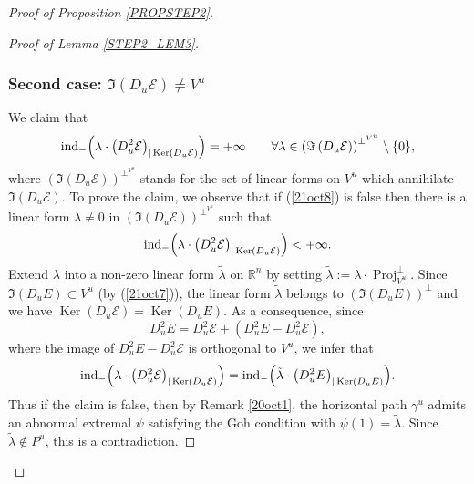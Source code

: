 \documentclass[JEP,XML,SOM,Unicode,NoFloatCountersInSection,published]{cedram}
\DeclareMathOperator{\Ker}{Ker}
\DeclareMathOperator{\Proj}{Proj}
\newcommand\R{\mathbb R}
\theoremstyle{definition}
\begin{document}
\begin{proof}[Proof of Proposition \ref{PROPSTEP2}]
\begin{proof}[Proof of Lemma \ref{STEP2_LEM3}]
\subsubsection*{Second case: $ \Im (D_{u} \mathcal{E})\neq V^{u}$}
We claim that
\begin{equation}\label{21oct8}
\mathrm{ind}_- \Bigl(\lambda \cdot \left(D^2_{u} \mathcal{E} \right)_{\vert \Ker (D_{u} \mathcal{E})} \Bigr) =+\infty \qquad \forall \lambda \in \left(\Im \left(D_{u} \mathcal{E} \right)\right)^{\perp^{V^u}} \setminus \{0\},
\end{equation}
where $(\Im (D_{u} \mathcal{E}))^{\perp^{V^u}}$ stands for the set of linear forms on $V^u$ which annihilate $ \Im (D_{u} \mathcal{E})$. To prove the claim, we observe that if (\ref{21oct8}) is false then there is a linear form $\lambda \neq 0$ in $(\Im (D_{u} \mathcal{E}))^{\perp^{V^u}}$ such that
\[
\mathrm{ind}_- \Bigl(\lambda \cdot \left(D^2_{u} \mathcal{E} \right)_{\vert \Ker (D_{u} \mathcal{E})} \Bigr) < +\infty.
\]
Extend $\lambda$ into a non-zero linear form $\tilde{\lambda}$ on $\R^n$ by setting $\tilde{\lambda} := \lambda \cdot \Proj_{V^u}^{\perp}$. Since $\Im \left(D_{u}E\right) \subset V^{u}$ (by (\ref{21oct7})), the linear form $\tilde{\lambda}$ belongs to $(\Im (D_{u}E))^{\perp}$ and we have $\Ker(D_{u} \mathcal{E})=\Ker(D_{u}E)$. As a consequence, since
\[
D^2_{u} E = D^2_{u} \mathcal{E} +(D^2_{u} E -D^2_{u} \mathcal{E}),
\]
where the image of $D^2_{u} E -D^2_{u} \mathcal{E} $ is orthogonal to $V^{u}$, we infer that
\[
\mathrm{ind}_- \Bigl(\lambda \cdot \left(D^2_{u} \mathcal{E} \right)_{\vert \Ker (D_{u} \mathcal{E})} \Bigr) = \mathrm{ind}_- \Bigl(\tilde{\lambda} \cdot \left(D^2_{u} E \right)_{\vert \Ker (D_{u} E)} \Bigr).
\]
Thus if the claim is false, then by Remark \ref{20oct1}, the horizontal path $\gamma^{u}$ admits an abnormal extremal $\psi$ satisfying the Goh condition with $\psi(1)=\tilde{\lambda}$. Since $\tilde{\lambda}\notin P^{u}$, this is a contradiction. 


\end{proof}
\end{proof}
\end{document}
